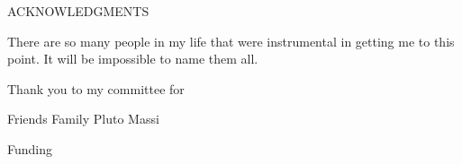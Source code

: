 \begin{center}
ACKNOWLEDGMENTS
\end{center}

There are so many people in my life that were instrumental in getting me to this point.
It will be impossible to name them all.

Thank you to my committee for 


Friends
Family
Pluto
Massi

Funding
